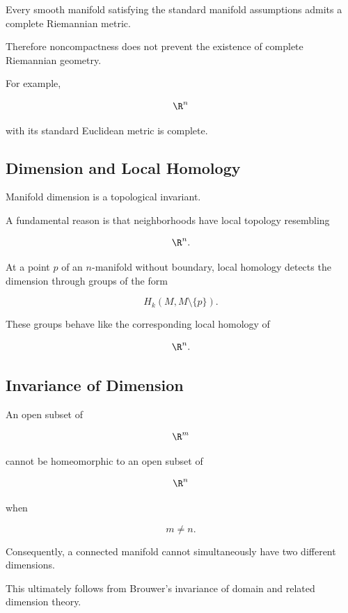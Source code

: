 Every smooth manifold satisfying the standard manifold assumptions admits a
complete Riemannian metric.

Therefore noncompactness does not prevent the existence of complete
Riemannian geometry.

For example,

\[
\R^n
\]

with its standard Euclidean metric is complete.

\subsection{Dimension and Local Homology}
\label{subsec:dimension-local-homology}

Manifold dimension is a topological invariant.

A fundamental reason is that neighborhoods have local topology resembling

\[
\R^n.
\]

At a point \(p\) of an \(n\)-manifold without boundary, local homology
detects the dimension through groups of the form

\[
\boxed{
H_k(M,M\setminus\{p\}).
}
\]

These groups behave like the corresponding local homology of

\[
\R^n.
\]

\subsection{Invariance of Dimension}
\label{subsec:invariance-dimension-manifolds}

An open subset of

\[
\R^m
\]

cannot be homeomorphic to an open subset of

\[
\R^n
\]

when

\[
m\neq n.
\]

Consequently, a connected manifold cannot simultaneously have two different
dimensions.

This ultimately follows from Brouwer's invariance of domain and related
dimension theory.

